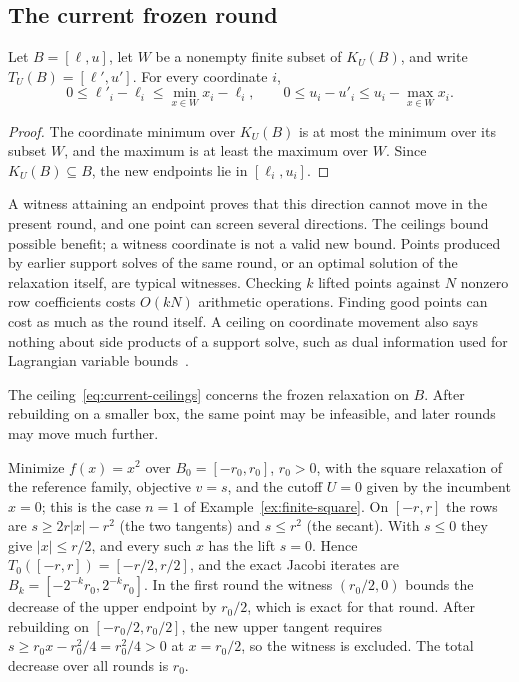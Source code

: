 \subsection{The current frozen round}\label{sec:cert-current}

\begin{proposition}\label{prop:current-round}
Let $B=[\ell,u]$, let $W$ be a nonempty finite subset of $K_U(B)$, and
write $T_U(B)=[\ell',u']$. For every coordinate $i$,
\begin{equation}\label{eq:current-ceilings}
 0\le\ell'_i-\ell_i\le\min_{x\in W}x_i-\ell_i,\qquad
 0\le u_i-u'_i\le u_i-\max_{x\in W}x_i.
\end{equation}
\end{proposition}
\begin{proof}
The coordinate minimum over $K_U(B)$ is at most the minimum over its
subset $W$, and the maximum is at least the maximum over $W$. Since
$K_U(B)\subseteq B$, the new endpoints lie in $[\ell_i,u_i]$.
\end{proof}

A witness attaining an endpoint proves that this direction cannot move in
the present round, and one point can screen several directions. The
ceilings bound possible benefit; a witness coordinate is not a valid new
bound. Points produced by earlier support solves of the same round, or
an optimal solution of the relaxation itself, are typical witnesses.
Checking $k$ lifted points against $N$ nonzero row coefficients costs
$O(kN)$ arithmetic operations. Finding good points can cost as much as the
round itself. A ceiling on coordinate movement also says nothing about
side products of a support solve, such as dual information used for
Lagrangian variable
bounds~\cite{gleixner2017-three-enhancements-for-optimization-based}.

The ceiling~\eqref{eq:current-ceilings} concerns the frozen relaxation
on $B$. After rebuilding on a smaller box, the same point may be
infeasible, and later rounds may move much further.

\begin{example}\label{ex:halving}
Minimize $f(x)=x^2$ over $B_0=[-r_0,r_0]$, $r_0>0$, with the square
relaxation of the reference family, objective $v=s$, and the cutoff $U=0$
given by the incumbent $x=0$; this is the case $n=1$ of
Example~\ref{ex:finite-square}. On $[-r,r]$ the rows are $s\ge2r|x|-r^2$
(the two tangents) and $s\le r^2$ (the secant). With $s\le0$ they give
$|x|\le r/2$, and every such $x$ has the lift $s=0$. Hence
$T_0([-r,r])=[-r/2,r/2]$, and the exact Jacobi iterates are
$B_k=[-2^{-k}r_0,2^{-k}r_0]$. In the first round the witness $(r_0/2,0)$
bounds the decrease of the upper endpoint by $r_0/2$, which is exact for
that round. After rebuilding on $[-r_0/2,r_0/2]$, the new upper tangent
requires $s\ge r_0x-r_0^2/4=r_0^2/4>0$ at $x=r_0/2$, so the witness is
excluded. The total decrease over all rounds is $r_0$.
\end{example}

